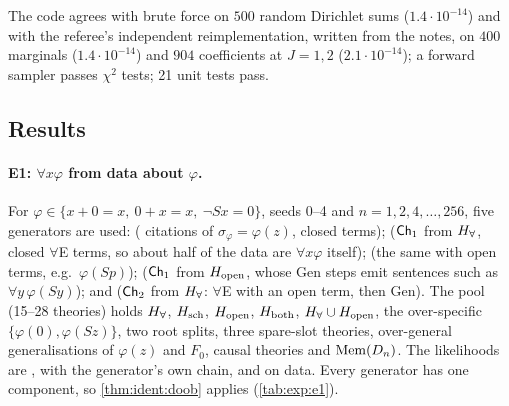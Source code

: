 \noindent The code agrees with brute force on $500$ random Dirichlet sums ($1.4\cdot10^{-14}$) and with the referee's independent reimplementation, written from the notes, on $400$ marginals ($1.4\cdot10^{-14}$) and $904$ \Lone{} coefficients at $J=1,2$ ($2.1\cdot10^{-14}$); a forward sampler passes $\chi^2$ tests; 21 unit tests pass.

\subsection{Results}\label{sec:exp:results}

\paragraph{E1: $\forall x\varphi$ from data about $\varphi$.}
For $\varphi\in\{x+0=x,\ 0+x=x,\ \neg Sx=0\}$, seeds 0--4 and $n=1,2,4,\dots,256$, five generators are used:  (\Lzero{} citations of $\sigma_\varphi=\varphi(z)$, closed terms);  ($\mathsf{Ch}_{1}$ from $H_{\forall}$, closed $\forall$E terms, so about half of the data are $\forall x\varphi$ itself);  (the same with open terms, e.g.\ $\varphi(Sp)$);  ($\mathsf{Ch}_{1}$ from $H_{\mathrm{open}}$, whose Gen steps emit sentences such as $\forall y\,\varphi(Sy)$); and  ($\mathsf{Ch}_{2}$ from $H_{\forall}$: $\forall$E with an open term, then Gen). The pool (15--28 theories) holds $H_{\forall}$, $H_{\mathrm{sch}}$, $H_{\mathrm{open}}$, $H_{\mathrm{both}}$, $H_{\forall}\cup H_{\mathrm{open}}$, the over-specific $\{\varphi(0),\varphi(Sz)\}$, two root splits, three spare-slot theories, over-general generalisations of $\varphi(z)$ and $F_0$, causal theories and $\mathrm{Mem}(D_n)$. The likelihoods are \Lzero, \Lone{} with the generator's own chain, and \Lselc{} on  data. Every generator has one component, so \cref{thm:ident:doob} applies (\cref{tab:exp:e1}).

